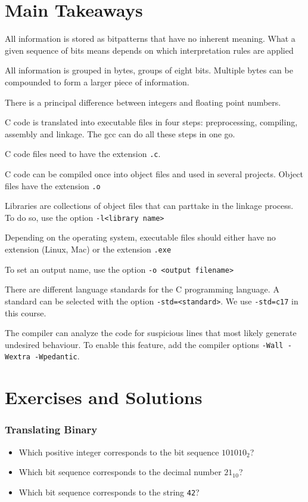 \section{Main Takeaways} 
\begin{itembox}
\item All information is stored as bitpatterns that have no inherent meaning. What a given sequence of bits means depends on which interpretation rules are applied
\item All information is grouped in bytes, \ie groups of eight bits. Multiple bytes can be compounded to form a larger piece of information.
\item There is a principal difference between integers and floating point numbers.
\end{itembox}
%
\begin{itembox}
\item C code is translated into executable files in four steps: preprocessing, compiling, assembly and linkage. The gcc can do all these steps in one go.
\item C code files need to have the extension \texttt{.c}.
\item C code can be compiled once into object files and used in several projects. Object files have the extension \texttt{.o}
\item Libraries are collections of object files that can parttake in the linkage process. To do so, use the option \texttt{-l<library name>}
\item Depending on the operating system, executable files should either have no extension (Linux, Mac) or the extension \texttt{.exe}
\item To set an output name, use the option \texttt{-o <output filename>}
\item There are different language standards for the C programming language. A standard can be selected with the option \texttt{-std=<standard>}. We use \texttt{-std=c17} in this course.
\item The compiler can analyze the code for suspicious lines that most likely generate undesired behaviour. To enable this feature, add the compiler options \texttt{-Wall -Wextra -Wpedantic}.
\end{itembox}

\newpage
\section{Exercises and Solutions}
\subsubsection*{Translating Binary}
\begin{itemize}
\item Which positive integer corresponds to the bit sequence $101010_2$?
\item Which bit sequence corresponds to the decimal number $21_{10}$?
\item Which bit sequence corresponds to the string \texttt{42}?
\end{itemize}

